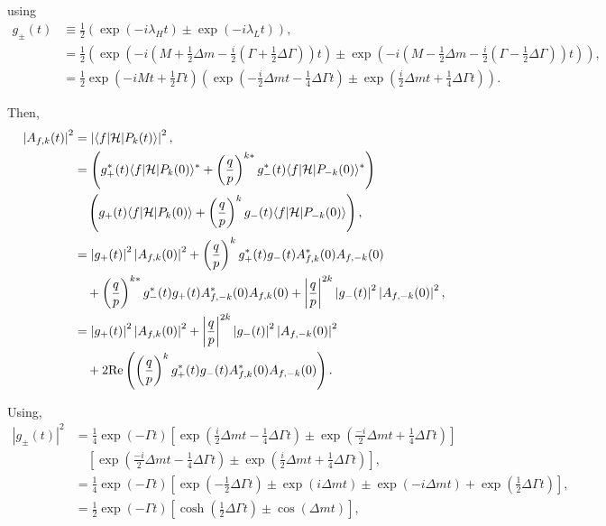 \documentclass{report}
\def\Deltam{\ensuremath{\Delta m}\xspace}
\def\Deltagamma{\ensuremath{\Delta\Gamma}\xspace}
\def\half{\ensuremath{\frac{1}{2}}\xspace}
\def\PPk{\ensuremath{\PP_k}\xspace}
\def\PPkm{\ensuremath{\PP_{-k}}\xspace}
\newcommand\magsq[1]{\ensuremath{\left|#1\right|^2}\xspace}
\def\hamil{\ensuremath{\mathcal{H}}\xspace}
\begin{document}
using
\begin{align}
  g_\pm(t) &\equiv \half \left(\exp(-i \lambda_H t) \pm \exp(-i \lambda_L t)\right), \\
  &= \half \left( \exp\left(-i \left(M + \half \Deltam - \frac{i}{2} \left(\Gamma + \half\Deltagamma\right)\right) t\right) \pm \exp\left(-i \left(M - \half \Deltam - \frac{i}{2} \left(\Gamma - \half\Deltagamma\right)\right) t\right)\right), \\
  &= \half \exp\left(-i M t + \half \Gamma t \right) \left(\exp\left(-\frac{i}{2} \Deltam t - \frac{1}{4} \Deltagamma t\right) \pm \exp\left(\frac{i}{2} \Deltam t + \frac{1}{4} \Deltagamma t\right)\right).
\end{align}

Then,
\begin{align}
  \magsq{A_{f,k}(t)} &= \magsq{\bra{f}\hamil\ket{\PPk(t)}},\\
  &= \left(g_+^*(t)\bra{f}\hamil\ket{\PPk(0)}^* + \left(\frac{q}{p}\right)^{k*} g_-^*(t) \bra{f}\hamil\ket{\PPkm(0)}^*\right) \\
    & \quad \left(g_+(t) \bra{f}\hamil\ket{\PPk(0)} + \left(\frac{q}{p}\right)^k g_-(t) \bra{f}\hamil\ket{\PPkm(0)}\right), \\
  &= \magsq{g_+(t)}\magsq{A_{f,k}(0)}  + \left(\frac{q}{p}\right)^k g_+^*(t)g_-(t)A_{f,k}^*(0) A_{f,-k}(0) \\
  &\quad + \left(\frac{q}{p}\right)^{k*} g_-^*(t) g_{+}(t) A_{f,-k}^*(0) A_{f,k}(0) + \left|\frac{q}{p}\right|^{2k} \magsq{g_-(t)}\magsq{A_{f,-k}(0)}, \\
  &= \magsq{g_+(t)} \magsq{A_{f,k}(0)} + \left|\frac{q}{p}\right|^{2k} \magsq{g_-(t)}\magsq{A_{f,-k}(0)} \\
  &\quad + 2 \mathrm{Re}\left(\left(\frac{q}{p}\right)^k g_+^*(t)g_-(t) A_{f,k}^*(0)A_{f,-k}(0) \right).
\end{align}

Using,
\begin{align}
  \magsq{g_\pm(t)} &= \frac{1}{4} \exp(-\Gamma t) \left[\exp\left(\frac{i}{2}\Deltam t - \frac{1}{4} \Deltagamma t\right) \pm \exp\left(\frac{-i}{2}\Deltam t + \frac{1}{4} \Deltagamma t\right)\right] \\
  & \quad \left[\exp\left(\frac{-i}{2}\Deltam t - \frac{1}{4} \Deltagamma t\right) \pm \exp\left(\frac{i}{2}\Deltam t + \frac{1}{4} \Deltagamma t\right)\right], \\
  &= \frac{1}{4} \exp(-\Gamma t) \left[\exp\left(-\half \Deltagamma t\right) \pm \exp\left(i\Deltam t\right) \pm \exp(-i\Deltam t) + \exp\left(\half\Deltagamma t\right)\right], \\
  &= \frac{1}{2} \exp(-\Gamma t)\left[\cosh\left(\half \Deltagamma t\right) \pm \cos(\Deltam t)\right],
\end{align}
\end{document}

